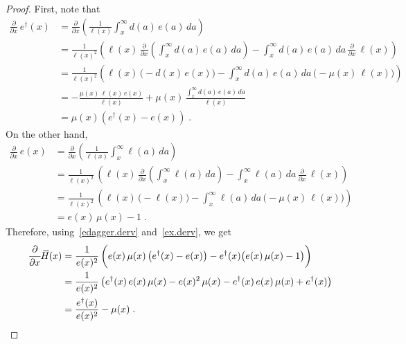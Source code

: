 \documentclass[a4paper,twoside, openright, 12pt, leqno]{article}
\newcommand*\xbar[1]{%
   \hbox{%
     \vbox{%
       \hrule height 0.5pt %
       \kern0.3ex%
       \hbox{%
         \kern-0.28em%
         \ensuremath{#1}%
         \kern-0.05em%
       }%
     }%
   }%
}
\begin{document}
\begin{proof}
First, note that
%
\begin{equation}
 \begin{split}
  \frac{\partial}{\partial x}\,e^\dagger(x)	    
            & = \frac{\partial}{\partial x}\left(\frac{1}{\ell(x)}\int_x^\infty d(a)\,e(a)\,da\right)   \\
            & = \frac{1}{\ell(x)^2}\left(\ell(x)\,\frac{\partial}{\partial x}\left(\int_x^\infty d(a)\,e(a)\,da\right)-\int_x^\infty d(a)\,e(a)\,da\,\frac{\partial}{\partial x}\,\ell(x)\right)                                    \\
            & = \frac{1}{\ell(x)^2}\left(\ell(x)\,\big(-d(x)\,e(x)\big)-\int_x^\infty d(a)\,e(a)\,da\,\big(-\mu(x)\,\ell(x)\big)\right)                         \\
            & = -\frac{\mu(x)\,\ell(x)\,e(x)}{\ell(x)}+\mu(x)\,\frac{\int_x^\infty d(a)\,e(a)\,da}{\ell(x)}                                    \\
            & = \mu(x)\left(e^\dagger(x)-e(x)\right)\;.
 \end{split}
 \label{edagger.derv}
\end{equation}
%
On the other hand,
%
\begin{equation}
  \begin{split}
  \frac{\partial}{\partial x}\,e(x) 
        & = \frac{\partial }{\partial x}\left(\frac{1}{\ell(x)}\int_x^\infty\ell(a)\,da\right)    \\
        & = \frac{1}{\ell(x)^2}\,\left(\ell(x)\,\frac{\partial }{\partial x}\left(\int_x^\infty\ell(a)\,da\right)-\int_x^\infty\ell(a)\,da\,\frac{\partial }{\partial x}\,\ell(x)\right) \\
        & = \frac{1}{\ell(x)^2}\,\left(\ell(x)\,\big(-\ell(x)\big)-\int_x^\infty\ell(a)\,da\,\big(-\mu(x)\,\ell(x)\big)\right)                                  \\
        & = e(x)\,\mu(x)-1\;.
  \end{split}
  \label{ex.derv}
\end{equation}
%
Therefore, using~\eqref{edagger.derv} and~\eqref{ex.derv}, we get
%
\begin{equation}
  \begin{split}
    \frac{\partial}{\partial x}\,\xbar{H}(x)
      & = \frac{1}{e(x)^2}\,\bigg(e(x)\,\mu(x)\left(e^\dagger(x)-e(x)\right)-e^\dagger(x)\big(e(x)\,\mu(x)-1\big)\bigg)                \\
      & = \frac{1}{e(x)^2}\left(e^\dagger(x)\,e(x)\,\mu(x)-e(x)^2\,\mu(x)-e^\dagger(x)\,e(x)\,\mu(x)+e^\dagger(x)\right)                              \\
      & = \frac{e^\dagger(x)}{e(x)^2}-\mu(x)\;.      
  \end{split}
  \label{eq:Hplus.derv}
\end{equation}


\end{proof}
\end{document}
